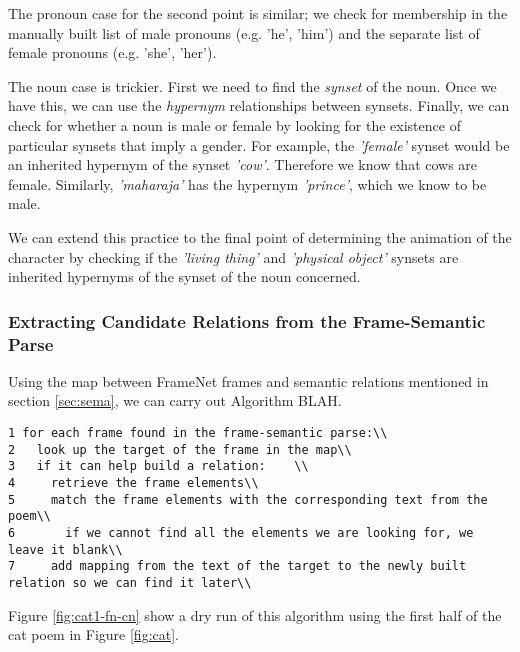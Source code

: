 The pronoun case for the second point is similar; we check for membership in the manually built list of male pronouns (e.g. 'he', 'him') and the separate list of female pronouns (e.g. 'she', 'her'). 

The noun case is trickier. First we need to find the \textit{synset} of the noun. Once we have this, we can use the \textit{hypernym} relationships between synsets. Finally, we can check for whether a noun is male or female by looking for the existence of particular synsets that imply a gender. For example, the \textit{'female'} synset would be an inherited hypernym of the synset \textit{'cow'}. Therefore we know that cows are female. Similarly, \textit{'maharaja'} has the hypernym \textit{'prince'}, which we know to be male.

We can extend this practice to the final point of determining the animation of the character by checking if the \textit{'living thing'} and \textit{'physical object'} synsets are inherited hypernyms of the synset of the noun concerned.


\subsubsection{Extracting Candidate Relations from the Frame-Semantic Parse}
\label{sec:candidate}

Using the map between FrameNet frames and semantic relations mentioned in section \ref{sec:sema}, we can carry out Algorithm BLAH.

\begin{verbatim}
1 for each frame found in the frame-semantic parse:\\
2   look up the target of the frame in the map\\
3   if it can help build a relation:	\\
4     retrieve the frame elements\\
5     match the frame elements with the corresponding text from the poem\\
6       if we cannot find all the elements we are looking for, we leave it blank\\
7     add mapping from the text of the target to the newly built relation so we can find it later\\
\end{verbatim}

Figure \ref{fig:cat1-fn-cn} show a dry run of this algorithm using the first half of the cat poem in Figure \ref{fig:cat}.

